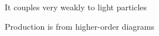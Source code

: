 {\bi
\item[-] It couples very weakly to light particles
\item[-] Production is from higher-order diagrams
\ei


\vspace*{0.3in}


%
%
%
%
%
%
%
%
%
}
